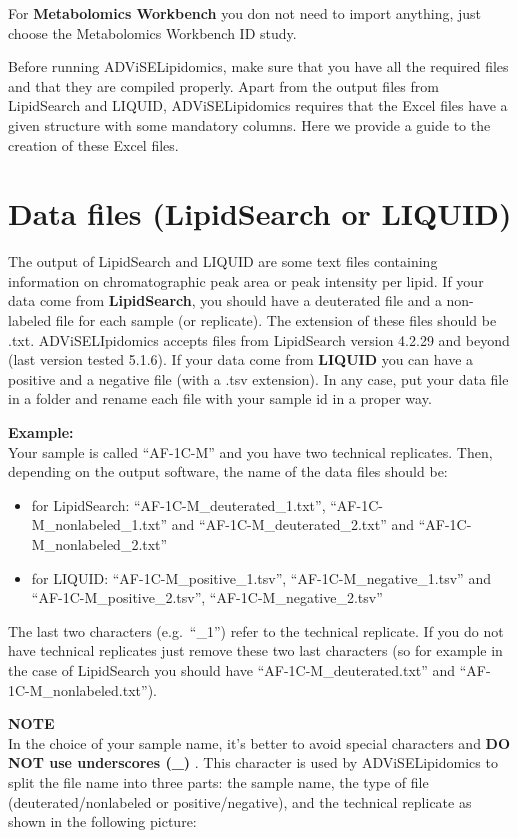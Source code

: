 \documentclass[
]{book}
\providecommand{\tightlist}{%
  \setlength{\itemsep}{0pt}\setlength{\parskip}{0pt}}
\begin{document}
For \textbf{Metabolomics Workbench} you don not need to import anything, just choose the Metabolomics Workbench ID study.

Before running ADViSELipidomics, make sure that you have all the required files and that they are compiled properly. Apart from the output files from LipidSearch and LIQUID, ADViSELipidomics requires that the Excel files have a given structure with some mandatory columns. Here we provide a guide to the creation of these Excel files.

\hypertarget{sec21}{%
\section{Data files (LipidSearch or LIQUID)}\label{sec21}}

The output of LipidSearch and LIQUID are some text files containing information on chromatographic peak area or peak intensity per lipid. If your data come from \textbf{LipidSearch}, you should have a deuterated file and a non-labeled file for each sample (or replicate). The extension of these files should be .txt. ADViSELIpidomics accepts files from LipidSearch version 4.2.29 and beyond (last version tested 5.1.6). If your data come from \textbf{LIQUID} you can have a positive and a negative file (with a .tsv extension). In any case, put your data file in a folder and rename each file with your sample id in a proper way.

\textbf{Example:}\\
Your sample is called ``AF-1C-M'' and you have two technical replicates. Then, depending on the output software, the name of the data files should be:

\begin{itemize}
\tightlist
\item
  for LipidSearch: ``AF-1C-M\_deuterated\_1.txt'', ``AF-1C-M\_nonlabeled\_1.txt'' and ``AF-1C-M\_deuterated\_2.txt'' and ``AF-1C-M\_nonlabeled\_2.txt''
\item
  for LIQUID: ``AF-1C-M\_positive\_1.tsv'', ``AF-1C-M\_negative\_1.tsv'' and ``AF-1C-M\_positive\_2.tsv'', ``AF-1C-M\_negative\_2.tsv''
\end{itemize}

The last two characters (e.g.~``\_1'') refer to the technical replicate. If you do not have technical replicates just remove these two last characters (so for example in the case of LipidSearch you should have ``AF-1C-M\_deuterated.txt'' and ``AF-1C-M\_nonlabeled.txt'').

\textbf{NOTE}\\
In the choice of your sample name, it's better to avoid special characters and \textbf{DO NOT use underscores (\_)} . This character is used by ADViSELipidomics to split the file name into three parts: the sample name, the type of file (deuterated/nonlabeled or positive/negative), and the technical replicate as shown in the following picture:
\end{document}
